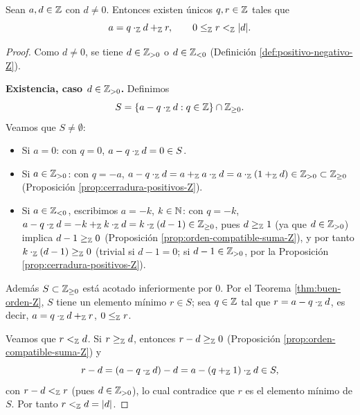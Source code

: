 \documentclass[12pt,a4paper]{book}
\begin{document}
    \begin{teorema}
        \label{thm:algoritmo-division-Z}
        Sean $a,d\in\mathbb{Z}$ con $d\neq0$. Entonces existen únicos $q,r\in\mathbb{Z}$ tales que
        \begin{equation*}
            a=q\cdot_{\mathbb{Z}}d+_{\mathbb{Z}}r, \qquad 0\le_{\mathbb{Z}}r<_{\mathbb{Z}}|d|.
        \end{equation*}
    \end{teorema}
    \begin{proof}
        Como $d\neq0$, se tiene $d\in\mathbb{Z}_{>0}$ o $d\in\mathbb{Z}_{<0}$ (Definición \ref{def:positivo-negativo-Z}).

        \textbf{Existencia, caso $d\in\mathbb{Z}_{>0}$.} Definimos
        \begin{equation*}
            S = \{a-q\cdot_{\mathbb{Z}}d : q\in\mathbb{Z}\}\cap\mathbb{Z}_{\ge0}.
        \end{equation*}
        Veamos que $S\neq\emptyset$:
        \begin{itemize}
            \item Si $a=0$: con $q=0$, $a-q\cdot_{\mathbb{Z}}d=0\in S$.
            \item Si $a\in\mathbb{Z}_{>0}$: con $q=-a$, $a-q\cdot_{\mathbb{Z}}d = a+_{\mathbb{Z}}a\cdot_{\mathbb{Z}}d = a\cdot_{\mathbb{Z}}(1+_{\mathbb{Z}}d)\in\mathbb{Z}_{>0}\subset\mathbb{Z}_{\ge0}$ (Proposición \ref{prop:cerradura-positivos-Z}).
            \item Si $a\in\mathbb{Z}_{<0}$, escribimos $a=-k$, $k\in\mathbb{N}$: con $q=-k$, $a-q\cdot_{\mathbb{Z}}d = -k+_{\mathbb{Z}}k\cdot_{\mathbb{Z}}d = k\cdot_{\mathbb{Z}}(d-1)\in\mathbb{Z}_{\ge0}$, pues $d\ge_{\mathbb{Z}}1$ (ya que $d\in\mathbb{Z}_{>0}$) implica $d-1\ge_{\mathbb{Z}}0$ (Proposición \ref{prop:orden-compatible-suma-Z}), y por tanto $k\cdot_{\mathbb{Z}}(d-1)\ge_{\mathbb{Z}}0$ (trivial si $d-1=0$; si $d-1\in\mathbb{Z}_{>0}$, por la Proposición \ref{prop:cerradura-positivos-Z}).
        \end{itemize}
        Además $S\subset\mathbb{Z}_{\ge0}$ está acotado inferiormente por $0$. Por el Teorema \ref{thm:buen-orden-Z}, $S$ tiene un elemento mínimo $r\in S$; sea $q\in\mathbb{Z}$ tal que $r=a-q\cdot_{\mathbb{Z}}d$, es decir, $a=q\cdot_{\mathbb{Z}}d+_{\mathbb{Z}}r$, $0\le_{\mathbb{Z}}r$.

        Veamos que $r<_{\mathbb{Z}}d$. Si $r\ge_{\mathbb{Z}}d$, entonces $r-d\ge_{\mathbb{Z}}0$ (Proposición \ref{prop:orden-compatible-suma-Z}) y
        \begin{equation*}
            r-d = (a-q\cdot_{\mathbb{Z}}d)-d = a-(q+_{\mathbb{Z}}1)\cdot_{\mathbb{Z}}d \in S,
        \end{equation*}
        con $r-d<_{\mathbb{Z}}r$ (pues $d\in\mathbb{Z}_{>0}$), lo cual contradice que $r$ es el elemento mínimo de $S$. Por tanto $r<_{\mathbb{Z}}d=|d|$.


\end{proof}
\end{document}
